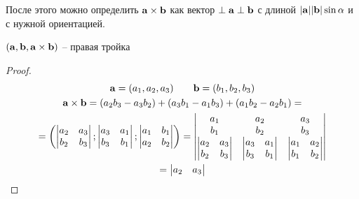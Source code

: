 \documentclass[main]{subfiles}
\begin{document}
\begin{remark}
    После этого можно определить $\mathbf{a} \times \mathbf{b}$ как вектор $\perp \mathbf{a} \perp \mathbf{b}$
    с длиной $|\mathbf{a}||\mathbf{b}|\sin\alpha$ и с нужной ориентацией.
\end{remark}
\begin{theorem}
    $(\mathbf{a}, \mathbf{b}, \mathbf{a} \times\mathbf{b})$ -- правая тройка
\end{theorem}
\begin{proof}
    \begin{gather*}
        \mathbf{a} = (a_1, a_2, a_3) \qquad \mathbf{b} = (b_1, b_2,b_3)\\
        \mathbf{a} \times \mathbf{b} =(a_2 b_3 - a_3 b_2) + (a_3 b_1 - a_1 b_3) + (a_1b_2 - a_2 b_1) =\\
        =\left(
        \begin{vmatrix}
            a_2 & a_3 \\
            b_2 & b_3
        \end{vmatrix};
        \begin{vmatrix}
            a_3 & a_1 \\
            b_3 & b_1
        \end{vmatrix};
        \begin{vmatrix}
            a_1 & b_1 \\
            a_2 & b_2
        \end{vmatrix}
        \right)
        = \begin{vmatrix}
            a_1                        & a_2 & a_3 \\
            b_1                        & b_2 & b_3 \\
            \begin{vmatrix}
                a_2 & a_3 \\
                b_2 & b_3
            \end{vmatrix} &
            \begin{vmatrix}
                a_3 & a_1 \\
                b_3 & b_1
            \end{vmatrix} &
            \begin{vmatrix}
                a_1 & a_2 \\
                b_1 & b_2
            \end{vmatrix}
        \end{vmatrix} \\
        = \begin{vmatrix}
            a_2 & a_3 \\

\end{vmatrix}
\end{gather*}
\end{proof}
\end{document}
